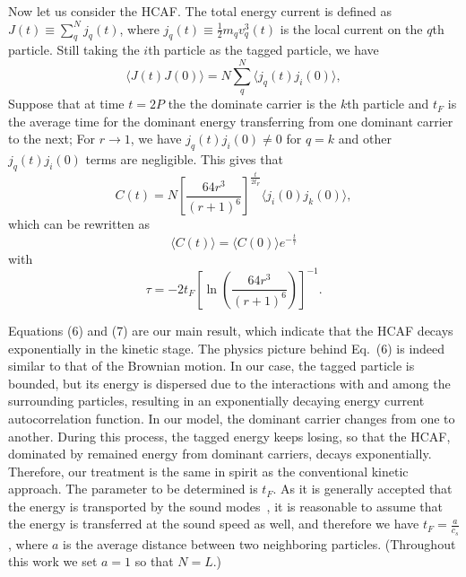 \documentclass[twocolumn,secnumarabic,amssymb, nobibnotes, aps, pre,superscriptaddress]{revtex4}
\begin{document}
Now let us consider the HCAF. The total energy current is defined as $J(t)\equiv \sum _{q}^N j_q(t)$, where $j_q(t)\equiv \frac{1}{2}m_q v_q^3(t)$  is the local current on the $q$th particle. Still taking the $i$th particle as the tagged particle, we have~\cite{lepri,zhong}
\begin{equation}
\langle J(t)J(0)\rangle=N\sum _{q}^N\langle j_q(t)j_i(0) \rangle,
\end{equation}
Suppose that at time $t=2P$ the the dominate carrier is the $k$th particle and $t_F$ is the average time for the dominant energy transferring from one dominant carrier to the next; For $r\to 1$, we have $j_q(t)j_i(0)\neq0$ for $q=k$ and other $j_q(t)j_i(0)$ terms are negligible. This gives that
\begin{equation}
C(t)=N[\frac {64r^3}{(r+1)^6}]^{\frac{t}{2t_F}}\langle j_i(0)j_k(0)\rangle,
\end{equation}
which can be rewritten as
\begin{equation}
\langle C(t)\rangle=\langle C(0)\rangle e^{-\frac{t}{\tau}}
\end{equation}
with
\begin{equation}
\tau=-2t_F[\ln(\frac{64r^3}{(r+1)^6})]^{-1}.
\end{equation}


Equations (6) and (7) are our main result, which indicate that the HCAF decays exponentially in the kinetic stage. The physics picture behind Eq.~(6) is indeed similar to that of the Brownian motion. In our case, the tagged particle is bounded, but its energy is dispersed due to the interactions with and among the surrounding particles, resulting in an exponentially decaying energy current autocorrelation function. In our model, the dominant carrier changes from one to another. During this process, the tagged energy keeps losing, so that the HCAF, dominated by remained energy from dominant carriers, decays exponentially. Therefore, our treatment is the same in spirit as the conventional kinetic approach. The parameter to be determined is $t_F$. As it is generally accepted that the energy is transported by the sound modes~\cite{hansen}, it is reasonable to assume that the energy is transferred at the sound speed as well, and therefore we have $t_F =\frac{a}{c_s}$, where $a$ is the average distance between two neighboring particles. (Throughout this work we set $a=1$ so that $N=L$.)
\end{document}
